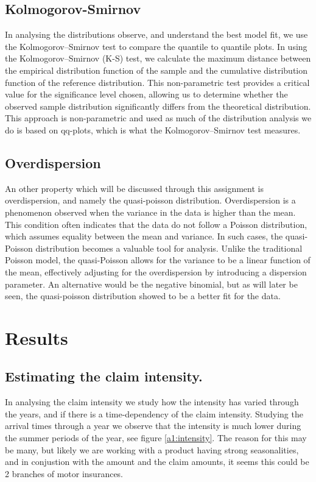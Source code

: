 \documentclass[11pt]{article}
\begin{document}
\subsection*{Kolmogorov-Smirnov}
In analysing the distributions observe, and understand the best model fit, we use the Kolmogorov–Smirnov test to compare the quantile to quantile plots.
In using the Kolmogorov–Smirnov (K-S) test, we calculate the maximum distance between the empirical distribution function of the sample and the cumulative distribution function of the reference distribution. 
This non-parametric test provides a critical value for the significance level chosen, allowing us to determine whether the observed sample distribution significantly differs from the theoretical distribution. 
This approach is non-parametric and used as much of the distribution analysis we do is based on qq-plots, which is what the Kolmogorov–Smirnov test measures.

\subsection*{Overdispersion}
An other property which will be discussed through this assignment is overdispersion, and namely the quasi-poisson distribution.
Overdispersion is a phenomenon observed when the variance in the data is higher than the mean. This condition often indicates that the data do not follow a Poisson distribution, which assumes equality between the mean and variance. 
In such cases, the quasi-Poisson distribution becomes a valuable tool for analysis. 
Unlike the traditional Poisson model, the quasi-Poisson allows for the variance to be a linear function of the mean, effectively adjusting for the overdispersion by introducing a dispersion parameter.  
An alternative would be the negative binomial, but as will later be seen, the quasi-poisson distribution showed to be a better fit for the data.

\section*{Results}

\subsection*{Estimating the claim intensity.}
In analysing the claim intensity we study how the intensity has varied through the years, and if there is a time-dependency of the claim intensity.
Studying the arrival times through a year we observe that the intensity is much lower during the summer periods of the year, see figure \ref{a1:intensity}. 
The reason for this may be many, but likely we are working with a product having strong seasonalities, and in conjustion with the amount and the claim amounts, it seems this could be 2 branches of motor insurances.
\end{document}
